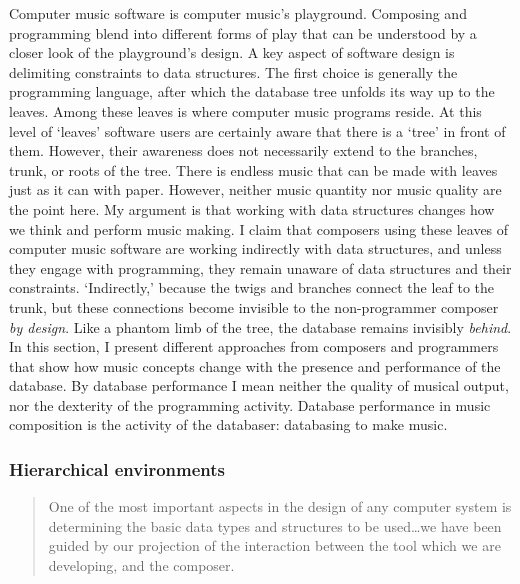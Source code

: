 
   

Computer music software is computer music's playground. Composing and programming blend into different forms of play that can be understood by a closer look of the playground's design. A key aspect of software design is delimiting constraints to data structures. The first choice is generally the programming language, after which the database tree unfolds its way up to the leaves. Among these leaves is where computer music programs reside. At this level of `leaves' software users are certainly aware that there is a `tree' in front of them. However, their awareness does not necessarily extend to the branches, trunk, or roots of the tree. There is endless music that can be made with leaves just as it can with paper. However, neither music quantity nor music quality are the point here. My argument is that working with data structures changes how we think and perform music making. I claim that composers using these leaves of computer music software are working indirectly with data structures, and unless they engage with programming, they remain unaware of data structures and their constraints. `Indirectly,' because the twigs and branches connect the leaf to the trunk, but these connections become invisible to the non-programmer composer \textit{by design}. Like a phantom limb of the tree, the database remains invisibly \textit{behind}. In this section, I present different approaches from composers and programmers that show how music concepts change with the presence and performance of the database. By database performance I mean neither the quality of musical output, nor the dexterity of the programming activity. Database performance in music composition is the activity of the databaser: databasing to make music.


\subsubsection{Hierarchical environments}
\label{computer:sssp}

	\begin{quote}
		One of the most important aspects in the design of any computer system is determining the basic data types and structures to be used\dots we have been guided by our projection of the interaction between the tool which we are developing, and the composer. \parencite[119]{icmc/bbp2372.1978.012}
	\end{quote}

